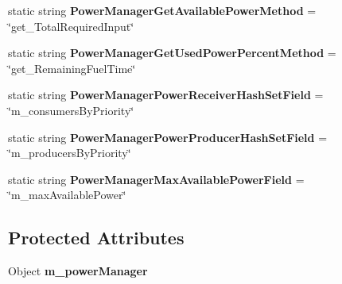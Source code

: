 \begin{DoxyCompactItemize}
\item 
\hypertarget{class_s_e_mod_a_p_i_internal_1_1_a_p_i_1_1_common_1_1_power_manager_ae6074c395c9d4d1f5d6154a3f786e3fb}{}static string {\bfseries Power\+Manager\+Get\+Available\+Power\+Method} = \char`\"{}get\+\_\+\+Total\+Required\+Input\char`\"{}\label{class_s_e_mod_a_p_i_internal_1_1_a_p_i_1_1_common_1_1_power_manager_ae6074c395c9d4d1f5d6154a3f786e3fb}

\item 
\hypertarget{class_s_e_mod_a_p_i_internal_1_1_a_p_i_1_1_common_1_1_power_manager_a93fadce0361e4c369ae80939eca29d6f}{}static string {\bfseries Power\+Manager\+Get\+Used\+Power\+Percent\+Method} = \char`\"{}get\+\_\+\+Remaining\+Fuel\+Time\char`\"{}\label{class_s_e_mod_a_p_i_internal_1_1_a_p_i_1_1_common_1_1_power_manager_a93fadce0361e4c369ae80939eca29d6f}

\item 
\hypertarget{class_s_e_mod_a_p_i_internal_1_1_a_p_i_1_1_common_1_1_power_manager_a7e6f9b6753ebf90645e0cb1c3e1dc464}{}static string {\bfseries Power\+Manager\+Power\+Receiver\+Hash\+Set\+Field} = \char`\"{}m\+\_\+consumers\+By\+Priority\char`\"{}\label{class_s_e_mod_a_p_i_internal_1_1_a_p_i_1_1_common_1_1_power_manager_a7e6f9b6753ebf90645e0cb1c3e1dc464}

\item 
\hypertarget{class_s_e_mod_a_p_i_internal_1_1_a_p_i_1_1_common_1_1_power_manager_ab4b037adb334ad50bb4c82292be519c2}{}static string {\bfseries Power\+Manager\+Power\+Producer\+Hash\+Set\+Field} = \char`\"{}m\+\_\+producers\+By\+Priority\char`\"{}\label{class_s_e_mod_a_p_i_internal_1_1_a_p_i_1_1_common_1_1_power_manager_ab4b037adb334ad50bb4c82292be519c2}

\item 
\hypertarget{class_s_e_mod_a_p_i_internal_1_1_a_p_i_1_1_common_1_1_power_manager_a145cdfe695d158323ab6fb05d2a46b08}{}static string {\bfseries Power\+Manager\+Max\+Available\+Power\+Field} = \char`\"{}m\+\_\+max\+Available\+Power\char`\"{}\label{class_s_e_mod_a_p_i_internal_1_1_a_p_i_1_1_common_1_1_power_manager_a145cdfe695d158323ab6fb05d2a46b08}

\end{DoxyCompactItemize}
\subsection*{Protected Attributes}
\begin{DoxyCompactItemize}
\item 
\hypertarget{class_s_e_mod_a_p_i_internal_1_1_a_p_i_1_1_common_1_1_power_manager_af0cb4066829eb215b0e97d7c9c3b2978}{}Object {\bfseries m\+\_\+power\+Manager}\label{class_s_e_mod_a_p_i_internal_1_1_a_p_i_1_1_common_1_1_power_manager_af0cb4066829eb215b0e97d7c9c3b2978}

\end{DoxyCompactItemize}
